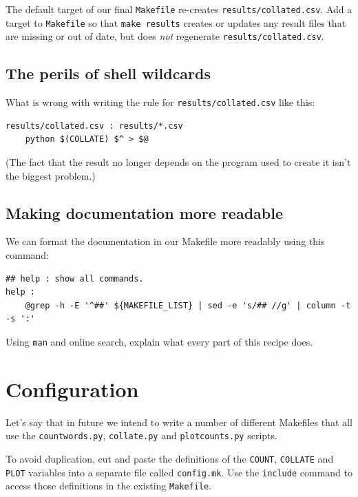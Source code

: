 \documentclass[
]{krantz}
\begin{document}
The default target of our final \texttt{Makefile} re-creates \texttt{results/collated.csv}.
Add a target to \texttt{Makefile}
so that \texttt{make\ results} creates or updates any result files that are missing or out of date,
but does \emph{not} regenerate \texttt{results/collated.csv}.

\hypertarget{automate-ex-wildcard-perils}{%
\subsection{The perils of shell wildcards}\label{automate-ex-wildcard-perils}}

What is wrong with writing the rule for \texttt{results/collated.csv} like this:

\begin{verbatim}
results/collated.csv : results/*.csv
    python $(COLLATE) $^ > $@
\end{verbatim}

(The fact that the result no longer depends on the program used to create it
isn't the biggest problem.)

\hypertarget{automate-ex-readable-docs}{%
\subsection{Making documentation more readable}\label{automate-ex-readable-docs}}

We can format the documentation in our Makefile more readably using this command:

\begin{verbatim}
## help : show all commands.
help :
    @grep -h -E '^##' ${MAKEFILE_LIST} | sed -e 's/## //g' | column -t -s ':'
\end{verbatim}

Using \texttt{man} and online search,
explain what every part of this recipe does.

\hypertarget{automate-ex-configuration}{%
\section{Configuration}\label{automate-ex-configuration}}

Let's say that in future we intend to write a number of different Makefiles
that all use the \texttt{countwords.py}, \texttt{collate.py} and \texttt{plotcounts.py} scripts.

To avoid duplication,
cut and paste the definitions of the \texttt{COUNT}, \texttt{COLLATE} and \texttt{PLOT} variables
into a separate file called \texttt{config.mk}.
Use the \texttt{include} command to access those definitions in the existing \texttt{Makefile}.
\end{document}
